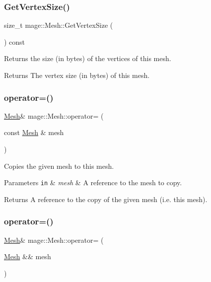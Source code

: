 \subsubsection{\texorpdfstring{Get\+Vertex\+Size()}{GetVertexSize()}}
{\footnotesize\ttfamily size\+\_\+t mage\+::\+Mesh\+::\+Get\+Vertex\+Size (\begin{DoxyParamCaption}{ }\end{DoxyParamCaption}) const\hspace{0.3cm}{\ttfamily [noexcept]}}

Returns the size (in bytes) of the vertices of this mesh.

\begin{DoxyReturn}{Returns}
The vertex size (in bytes) of this mesh. 
\end{DoxyReturn}
\hypertarget{classmage_1_1_mesh_a5baf961af32b379671a59a082492bc5e}{}\label{classmage_1_1_mesh_a5baf961af32b379671a59a082492bc5e} 
\subsubsection{\texorpdfstring{operator=()}{operator=()}\hspace{0.1cm}{\footnotesize\ttfamily [1/2]}}
{\footnotesize\ttfamily \hyperlink{classmage_1_1_mesh}{Mesh}\& mage\+::\+Mesh\+::operator= (\begin{DoxyParamCaption}\item[{const \hyperlink{classmage_1_1_mesh}{Mesh} \&}]{mesh }\end{DoxyParamCaption})\hspace{0.3cm}{\ttfamily [delete]}}

Copies the given mesh to this mesh.


\begin{DoxyParams}[1]{Parameters}
\mbox{\tt in}  & {\em mesh} & A reference to the mesh to copy. \\
\hline
\end{DoxyParams}
\begin{DoxyReturn}{Returns}
A reference to the copy of the given mesh (i.\+e. this mesh). 
\end{DoxyReturn}
\hypertarget{classmage_1_1_mesh_a28e437196db171b2df1c4bcf3df07a63}{}\label{classmage_1_1_mesh_a28e437196db171b2df1c4bcf3df07a63} 
\subsubsection{\texorpdfstring{operator=()}{operator=()}\hspace{0.1cm}{\footnotesize\ttfamily [2/2]}}
{\footnotesize\ttfamily \hyperlink{classmage_1_1_mesh}{Mesh}\& mage\+::\+Mesh\+::operator= (\begin{DoxyParamCaption}\item[{\hyperlink{classmage_1_1_mesh}{Mesh} \&\&}]{mesh }\end{DoxyParamCaption})\hspace{0.3cm}{\ttfamily [delete]}}

